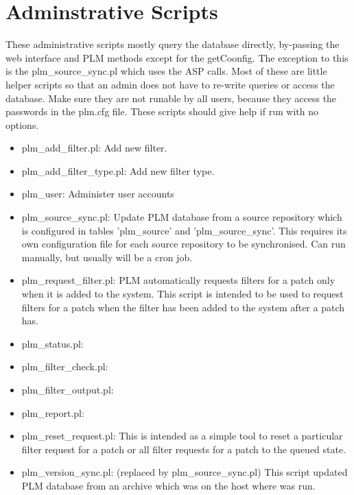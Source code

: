 \section {Adminstrative Scripts}
These administrative scripts mostly query the database directly, by-passing the web interface and PLM methods except for the getCoonfig.  The exception to this is the plm\_source\_sync.pl which uses the ASP calls.  Most of these are little helper scripts so that an admin does not have to re-write queries or access the database.  Make sure they are not runable by all users, because they access the passwords in the plm.cfg file.  These scripts should give help if run with no options. 

\begin{itemize}
\item plm\_add\_filter.pl:  Add new filter.
\item plm\_add\_filter\_type.pl:  Add new filter type.
\item plm\_user:  Administer user accounts
\item plm\_source\_sync.pl:  Update PLM database from a source repository which is configured in tables 'plm\_source' and 'plm\_source\_sync'.  This requires its own configuration file for each source repository to be synchronised.  Can run manually, but usually will be a cron job.
\item plm\_request\_filter.pl: PLM automatically requests filters for a patch only when it is added to the system.  This script is intended to be used to request filters for a patch when the filter has been added to the system after a patch has.
\item plm\_status.pl:
\item plm\_filter\_check.pl:
\item plm\_filter\_output.pl:
\item plm\_report.pl:
\item plm\_reset\_request.pl: This is intended as a simple tool to reset a particular filter request for a patch or all filter requests for a patch to the queued state.
\item plm\_version\_sync.pl:  (replaced by plm\_source\_sync.pl)  This script updated PLM database from an archive which was on the host where was run.
\end{itemize}

